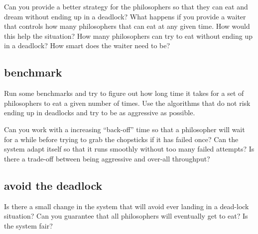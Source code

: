 \documentclass[a4paper,11pt]{article}
\begin{document}
Can you provide a better strategy for the philosophers so that they
can eat and dream without ending up in a deadlock? What happens if
you provide a waiter that controls how many philosophers that can eat
at any given time. How would this help the situation? How many
philosophers can try to eat without ending up in a deadlock? How
smart does the waiter need to be?

\subsection{benchmark}

Run some benchmarks and try to figure out how long time it takes for a
set of philosophers to eat a given number of times. Use the algorithms
that do not risk ending up in deadlocks and try to be as aggressive as
possible.  

Can you work with a increasing ``back-off'' time so that a philosopher
will wait for a while before trying to grab the chopsticks if it has
failed once? Can the system adapt itself so that it runs smoothly
without too many failed attempts? Is there a trade-off between being
aggressive and over-all throughput?

\subsection{avoid the deadlock}

Is there a small change in the system that will avoid ever landing in
a dead-lock situation? Can you guarantee that all philosophers will
eventually get to eat? Is the system fair?
\end{document}
